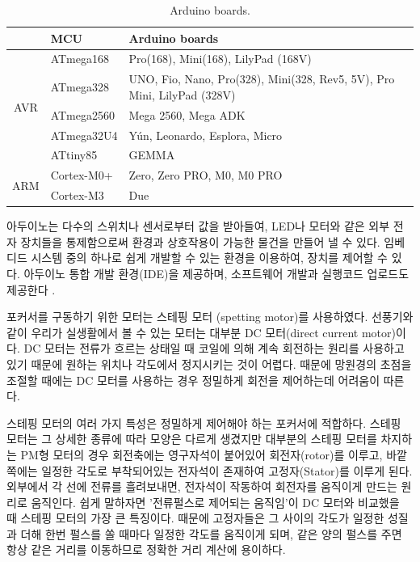 \begin{table}[ht]
	\caption{Arduino boards. \cite{wiki-arduino}}
	\begin{tabular}{c|l|l}
	\toprule[1pt]
		& MCU        & Arduino boards                            \\ 
		\toprule[1pt]
	
		\multirow{5}{*}{AVR} & ATmega168  & Pro(168), Mini(168), LilyPad (168V)                                     \\
		& ATmega328  & UNO, Fio, Nano, Pro(328), Mini(328, Rev5, 5V), Pro Mini, LilyPad (328V) \\
		& ATmega2560 & Mega 2560, Mega ADK                                                     \\
		& ATmega32U4 & Yún, Leonardo, Esplora, Micro                                           \\
		& ATtiny85   & GEMMA                                                                   \\ 
		\midrule[1pt]
		\multirow{2}{*}{ARM} & Cortex-M0+ & Zero, Zero PRO, M0, M0 PRO                                              \\
		& Cortex-M3  & Due      \\
	\bottomrule[1pt]   
	\end{tabular}
	\label{table:arduino_boards}
\end{table}

아두이노는 다수의 스위치나 센서로부터 값을 받아들여, LED나 모터와 같은 외부 전자 장치들을 통제함으로써 환경과 상호작용이 가능한 물건을 만들어 낼 수 있다. 임베디드 시스템 중의 하나로 쉽게 개발할 수 있는 환경을 이용하여, 장치를 제어할 수 있다. 아두이노 통합 개발 환경(IDE)을 제공하며, 소프트웨어 개발과 실행코드 업로드도 제공한다 \cite{wiki-arduino}. 

포커서를 구동하기 위한 모터는 스테핑 모터 (spetting motor)를 사용하였다. 선풍기와 같이 우리가 실생활에서 볼 수 있는 모터는 대부분 DC 모터(direct current motor)이다. DC 모터는 전류가 흐르는 상태일 때 코일에 의해 계속 회전하는 원리를 사용하고 있기 때문에 원하는 위치나 각도에서 정지시키는 것이 어렵다. 때문에 망원경의 초점을 조절할 때에는 DC 모터를 사용하는 경우 정밀하게 회전을 제어하는데 어려움이 따른다. 

스테핑 모터의 여러 가지 특성은 정밀하게 제어해야 하는 포커서에 적합하다. 스테핑 모터는 그 상세한 종류에 따라 모양은 다르게 생겼지만 대부분의 스테핑 모터를 차지하는 PM형 모터의 경우 회전축에는 영구자석이 붙어있어 회전자(rotor)를 이루고, 바깥쪽에는 일정한 각도로 부착되어있는 전자석이 존재하여 고정자(Stator)를 이루게 된다. 외부에서 각 선에 전류를 흘려보내면, 전자석이 작동하여 회전자를 움직이게 만드는 원리로 움직인다. 쉽게 말하자면 '전류펄스로 제어되는 움직임'이 DC 모터와 비교했을 때 스테핑 모터의 가장 큰 특징이다. 때문에 고정자들은 그 사이의 각도가 일정한 성질과 더해 한번 펄스를 쏠 때마다 일정한 각도를 움직이게 되며, 같은 양의 펄스를 주면 항상 같은 거리를 이동하므로 정확한 거리 계산에 용이하다.

